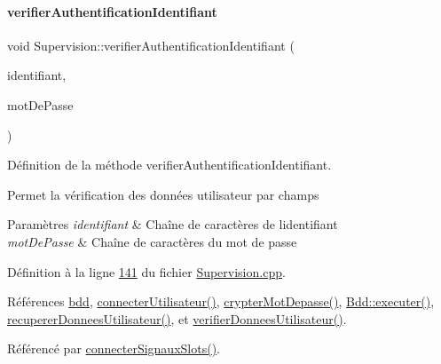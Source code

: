 \paragraph{\texorpdfstring{verifier\+Authentification\+Identifiant}{verifierAuthentificationIdentifiant}}
{\footnotesize\ttfamily void Supervision\+::verifier\+Authentification\+Identifiant (\begin{DoxyParamCaption}\item[{Q\+String}]{identifiant,  }\item[{Q\+String}]{mot\+De\+Passe }\end{DoxyParamCaption})\hspace{0.3cm}{\ttfamily [slot]}}



Définition de la méthode verifier\+Authentification\+Identifiant. 

Permet la vérification des données utilisateur par champs 
\begin{DoxyParams}{Paramètres}
{\em identifiant} & Chaîne de caractères de l\textquotesingle{}identifiant \\
\hline
{\em mot\+De\+Passe} & Chaîne de caractères du mot de passe \\
\hline
\end{DoxyParams}


Définition à la ligne \hyperlink{_supervision_8cpp_source_l00141}{141} du fichier \hyperlink{_supervision_8cpp_source}{Supervision.\+cpp}.



Références \hyperlink{_supervision_8h_source_l00080}{bdd}, \hyperlink{_supervision_8cpp_source_l00256}{connecter\+Utilisateur()}, \hyperlink{_supervision_8cpp_source_l00179}{crypter\+Mot\+Depasse()}, \hyperlink{_bdd_8cpp_source_l00146}{Bdd\+::executer()}, \hyperlink{_supervision_8cpp_source_l00165}{recuperer\+Donnees\+Utilisateur()}, et \hyperlink{_supervision_8cpp_source_l00224}{verifier\+Donnees\+Utilisateur()}.



Référencé par \hyperlink{_supervision_8cpp_source_l00273}{connecter\+Signaux\+Slots()}.


